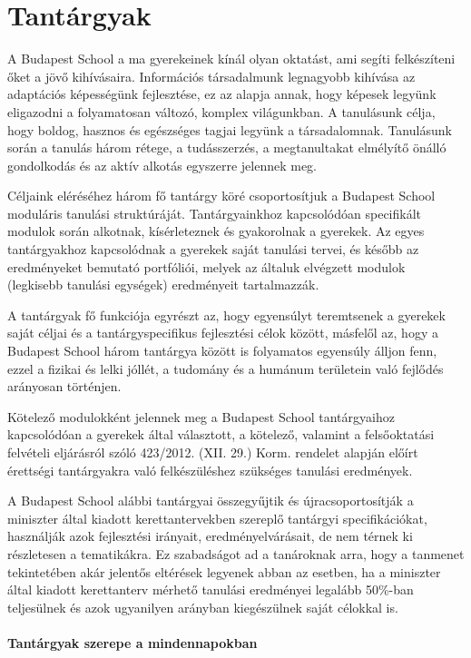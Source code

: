 \section{Tantárgyak}
\label{sec:tantargyak}
A Budapest School a ma gyerekeinek kínál olyan oktatást, ami segíti
felkészíteni őket a jövő kihívásaira. Információs társadalmunk legnagyobb
kihívása az adaptációs képességünk fejlesztése, ez az alapja annak, hogy
képesek legyünk eligazodni a folyamatosan változó, komplex világunkban. A
tanulásunk célja, hogy boldog, hasznos és egészséges tagjai legyünk a
társadalomnak. Tanulásunk során a tanulás három rétege, a tudásszerzés, a
megtanultakat elmélyítő önálló gondolkodás és az aktív alkotás egyszerre
jelennek meg. 

Céljaink eléréséhez három fő tantárgy köré csoportosítjuk a
Budapest School moduláris tanulási struktúráját. Tantárgyainkhoz kapcsolódóan
specifikált modulok során alkotnak, kísérleteznek és gyakorolnak a gyerekek. Az egyes tantárgyakhoz kapcsolódnak a gyerekek saját tanulási
tervei, és később az eredményeket bemutató portfóliói, melyek az általuk
elvégzett modulok (legkisebb tanulási egységek) eredményeit tartalmazzák.

A tantárgyak fő funkciója egyrészt az, hogy egyensúlyt teremtsenek a gyerekek
saját céljai és a tantárgyspecifikus fejlesztési célok között, másfelől az,
hogy a Budapest School három tantárgya között is folyamatos egyensúly álljon
fenn, ezzel a fizikai és lelki jóllét, a tudomány és a humánum területein való
fejlődés arányosan történjen.

Kötelező modulokként jelennek meg a Budapest School tantárgyaihoz kapcsolódóan
a gyerekek által választott, a kötelező, valamint a felsőoktatási felvételi
eljárásról szóló 423/2012. (XII. 29.) Korm. rendelet alapján előírt érettségi
tantárgyakra való felkészüléshez szükséges tanulási eredmények.

A Budapest School alábbi tantárgyai összegyűjtik és újracsoportosítják a
miniszter által kiadott kerettantervekben szereplő tantárgyi specifikációkat,
használják azok fejlesztési irányait, eredményelvárásait, de nem térnek ki
részletesen a tematikákra. Ez szabadságot ad a tanároknak arra, hogy a
tanmenet tekintetében akár jelentős eltérések legyenek abban az esetben, ha a
miniszter által kiadott kerettanterv mérhető tanulási eredményei legalább 50\%-ban
teljesülnek és azok ugyanilyen arányban kiegészülnek saját célokkal is.

\paragraph{Tantárgyak szerepe a mindennapokban}


